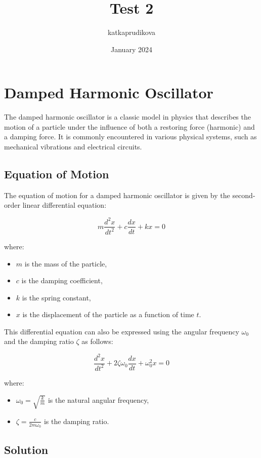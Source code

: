 \documentclass{article}
\title{Test 2}
\author{katkaprudikova}
\date{January 2024}
\begin{document}
\section*{Damped Harmonic Oscillator}

The damped harmonic oscillator is a classic model in physics that describes the motion of a particle under the influence of both a restoring force (harmonic) and a damping force. It is commonly encountered in various physical systems, such as mechanical vibrations and electrical circuits.

\subsection*{Equation of Motion}

The equation of motion for a damped harmonic oscillator is given by the second-order linear differential equation:

\begin{equation}
    m \frac{d^2x}{dt^2} + c \frac{dx}{dt} + kx = 0
\end{equation}

where:
\begin{itemize}
    \item $m$ is the mass of the particle,
    \item $c$ is the damping coefficient,
    \item $k$ is the spring constant,
    \item $x$ is the displacement of the particle as a function of time $t$.
\end{itemize}

This differential equation can also be expressed using the angular frequency $\omega_0$ and the damping ratio $\zeta$ as follows:

\begin{equation}
    \frac{d^2x}{dt^2} + 2\zeta\omega_0\frac{dx}{dt} + \omega_0^2x = 0
\end{equation}

where:
\begin{itemize}
    \item $\omega_0 = \sqrt{\frac{k}{m}}$ is the natural angular frequency,
    \item $\zeta = \frac{c}{2m\omega_0}$ is the damping ratio.
\end{itemize}

\subsection*{Solution}
\end{document}
